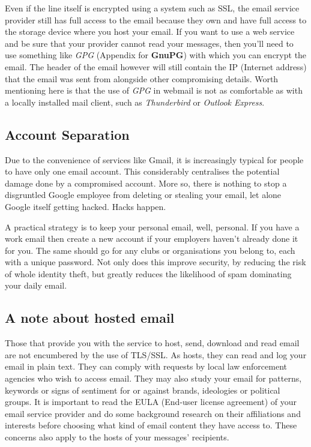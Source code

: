 Even if the line itself is encrypted using a system such as SSL, the
email service provider still has full access to the email because they
own and have full access to the storage device where you host your
email. If you want to use a web service and be sure that your provider
cannot read your messages, then you'll need to use something like
\emph{GPG} (Appendix for \textbf{GnuPG}) with which you can encrypt the
email. The header of the email however will still contain the IP
(Internet address) that the email was sent from alongside other
compromising details. Worth mentioning here is that the use of
\emph{GPG} in webmail is not as comfortable as with a locally installed
mail client, such as \emph{Thunderbird} or \emph{Outlook Express}.

\subsection{Account Separation}

Due to the convenience of services like Gmail, it is increasingly
typical for people to have only one email account. This considerably
centralises the potential damage done by a compromised account. More so,
there is nothing to stop a disgruntled Google employee from deleting or
stealing your email, let alone Google itself getting hacked. Hacks
happen.

A practical strategy is to keep your personal email, well, personal. If
you have a work email then create a new account if your employers
haven't already done it for you. The same should go for any clubs or
organisations you belong to, each with a unique password. Not only does
this improve security, by reducing the risk of whole identity theft, but
greatly reduces the likelihood of spam dominating your daily email.

\subsection{A note about hosted email}

Those that provide you with the service to host, send, download and read
email are not encumbered by the use of TLS/SSL. As hosts, they can read
and log your email in plain text. They can comply with requests by local
law enforcement agencies who wish to access email. They may also study
your email for patterns, keywords or signs of sentiment for or against
brands, ideologies or political groups. It is important to read the EULA
(End-user license agreement) of your email service provider and do some
background research on their affiliations and interests before choosing
what kind of email content they have access to. These concerns also
apply to the hosts of your messages' recipients.
